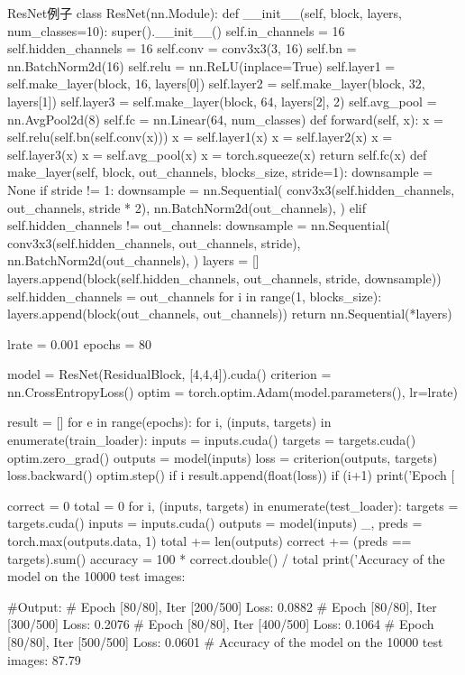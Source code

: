 \documentclass[openbib]{article}
\begin{document}
\begin{Python}{ResNet例子}
class ResNet(nn.Module):
	def __init__(self, block, layers, num_classes=10):
		super().__init__()
		self.in_channels = 16
		self.hidden_channels = 16
		self.conv = conv3x3(3, 16)
		self.bn = nn.BatchNorm2d(16)
		self.relu = nn.ReLU(inplace=True)
		self.layer1 = self.make_layer(block, 16, layers[0])
		self.layer2 = self.make_layer(block, 32, layers[1])
		self.layer3 = self.make_layer(block, 64, layers[2], 2)
		self.avg_pool = nn.AvgPool2d(8)
		self.fc = nn.Linear(64, num_classes)
	def forward(self, x):
		x = self.relu(self.bn(self.conv(x)))
		x = self.layer1(x)
		x = self.layer2(x)
		x = self.layer3(x)
		x = self.avg_pool(x)
		x = torch.squeeze(x)
		return self.fc(x)
	def make_layer(self, block, out_channels, blocks_size, stride=1):
		downsample = None
		if stride != 1:
			downsample = nn.Sequential(
							conv3x3(self.hidden_channels, out_channels, stride * 2),
							nn.BatchNorm2d(out_channels),
							)
		elif self.hidden_channels != out_channels:
			downsample = nn.Sequential(
							conv3x3(self.hidden_channels, out_channels, stride),
							nn.BatchNorm2d(out_channels),
							)
layers = []
layers.append(block(self.hidden_channels, out_channels, stride, downsample))
self.hidden_channels = out_channels
for i in range(1, blocks_size):
	layers.append(block(out_channels, out_channels))
	return nn.Sequential(*layers)

lrate = 0.001
epochs = 80

model = ResNet(ResidualBlock, [4,4,4]).cuda()
criterion = nn.CrossEntropyLoss()
optim = torch.optim.Adam(model.parameters(), lr=lrate)

result = []
for e in range(epochs):
	for i, (inputs, targets) in enumerate(train_loader):
		inputs = inputs.cuda()
		targets = targets.cuda()
		optim.zero_grad()
		outputs = model(inputs)
		loss = criterion(outputs, targets)
		loss.backward()
		optim.step()
if i %
	result.append(float(loss))
if (i+1) %
	print('Epoch [%

correct = 0
total = 0
for i, (inputs, targets) in enumerate(test_loader):
	targets = targets.cuda()
	inputs = inputs.cuda()
	outputs = model(inputs)
	_, preds = torch.max(outputs.data, 1)
	total += len(outputs)
	correct += (preds == targets).sum()
accuracy = 100 * correct.double() / total
print('Accuracy of the model on the 10000 test images: %

#Output:
#		Epoch [80/80], Iter [200/500] Loss: 0.0882
#		Epoch [80/80], Iter [300/500] Loss: 0.2076
#		Epoch [80/80], Iter [400/500] Loss: 0.1064
#		Epoch [80/80], Iter [500/500] Loss: 0.0601
#		Accuracy of the model on the 10000 test images: 87.79 %
\end{Python}
\end{document}
